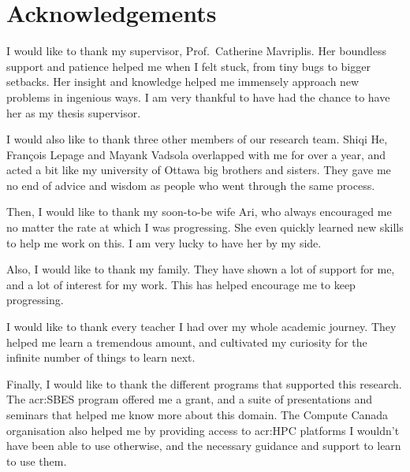 \chapter*{Acknowledgements}

I would like to thank my supervisor, Prof.\ Catherine Mavriplis. Her boundless support and patience
helped me when I felt stuck, from tiny bugs to bigger setbacks. Her insight and knowledge helped me
immensely approach new problems in ingenious ways. I am very thankful to have had the chance to have
her as my thesis supervisor.

I would also like to thank three other members of our research team. Shiqi He, François Lepage and
Mayank Vadsola overlapped with me for over a year, and acted a bit like my university of Ottawa big
brothers and sisters. They gave me no end of advice and wisdom as people who went through the same
process.

Then, I would like to thank my soon-to-be wife Ari, who always encouraged me no matter the rate at
which I was progressing. She even quickly learned new skills to help me work on this. I am very
lucky to have her by my side.

Also, I would like to thank my family. They have shown a lot of support for me, and a lot of
interest for my work. This has helped encourage me to keep progressing.

I would like to thank every teacher I had over my whole academic journey. They helped me learn a
tremendous amount, and cultivated my curiosity for the infinite number of things to learn next.

Finally, I would like to thank the different programs that supported this research. The
\acrfull{acr:SBES} program offered me a grant, and a suite of presentations and seminars that helped
me know more about this domain. The Compute Canada organisation also helped me by providing access
to \acrshort{acr:HPC} platforms I wouldn't have been able to use otherwise, and the necessary
guidance and support to learn to use them.